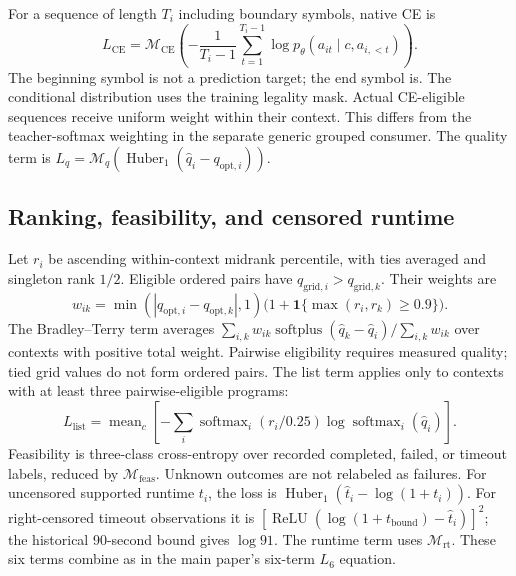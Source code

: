 For a sequence of length $T_i$ including boundary symbols, native CE is
\begin{equation}
 L_{\mathrm{CE}}=\mathcal{M}_{\mathrm{CE}}\!\left(
 -\frac{1}{T_i-1}\sum_{t=1}^{T_i-1}
 \log p_\theta(a_{it}\mid c,a_{i,<t})\right).
\end{equation}
The beginning symbol is not a prediction target; the end symbol is. The
conditional distribution uses the training legality mask. Actual CE-eligible
sequences receive uniform weight within their context. This differs from the
teacher-softmax weighting in the separate generic grouped consumer. The quality
term is
$L_q=\mathcal{M}_q(\operatorname{Huber}_1(\hat q_i-q_{\mathrm{opt},i}))$.

\subsection{Ranking, feasibility, and censored runtime}

Let $r_i$ be ascending within-context midrank percentile, with ties averaged and
singleton rank $1/2$. Eligible ordered pairs have
$q_{\mathrm{grid},i}>q_{\mathrm{grid},k}$. Their weights are
\begin{equation}
 w_{ik}=\min(|q_{\mathrm{opt},i}-q_{\mathrm{opt},k}|,1)
 \bigl(1+\mathbf{1}\{\max(r_i,r_k)\geq0.9\}\bigr).
\end{equation}
The Bradley--Terry term averages
$\sum_{i,k}w_{ik}\operatorname{softplus}(\hat q_k-\hat q_i)/\sum_{i,k}w_{ik}$
over contexts with positive total weight. Pairwise eligibility requires measured
quality; tied grid values do not form ordered pairs. The list term applies only
to contexts with at least three pairwise-eligible programs:
\begin{equation}
 L_{\mathrm{list}}=\operatorname{mean}_c
 \left[-\sum_i \operatorname{softmax}_i(r_i/0.25)
 \log\operatorname{softmax}_i(\hat q_i)\right].
\end{equation}
Feasibility is three-class cross-entropy over recorded completed, failed, or
timeout labels, reduced by $\mathcal{M}_{\mathrm{feas}}$. Unknown outcomes are
not relabeled as failures. For uncensored supported runtime $t_i$, the loss is
$\operatorname{Huber}_1(\hat t_i-\log(1+t_i))$. For right-censored timeout
observations it is $[\operatorname{ReLU}(\log(1+t_{\mathrm{bound}})-\hat t_i)]^2$;
the historical 90-second bound gives $\log91$. The runtime term uses
$\mathcal{M}_{\mathrm{rt}}$. These six terms combine as in
the main paper's six-term $L_6$ equation.


